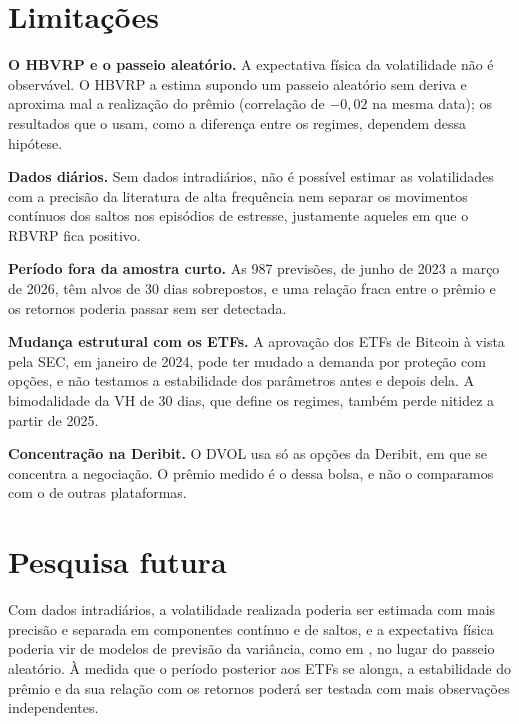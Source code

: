 \section{Limitações}
\label{sec:concl-limitacoes}

\textbf{O HBVRP e o passeio aleatório.} A expectativa física da volatilidade
não é observável. O HBVRP a estima supondo um passeio aleatório sem deriva e
aproxima mal a realização do prêmio (correlação de $-0{,}02$ na mesma data);
os resultados que o usam, como a diferença entre os regimes, dependem dessa
hipótese.

\textbf{Dados diários.} Sem dados intradiários, não é possível estimar as
volatilidades com a precisão da literatura de alta frequência
\citep{andersen2003realized} nem separar os movimentos contínuos dos saltos
nos episódios de estresse, justamente aqueles em que o RBVRP fica positivo.

\textbf{Período fora da amostra curto.} As 987 previsões, de junho de 2023 a
março de 2026, têm alvos de 30 dias sobrepostos, e uma relação fraca entre o
prêmio e os retornos poderia passar sem ser detectada.

\textbf{Mudança estrutural com os ETFs.} A aprovação dos ETFs de Bitcoin à
vista pela SEC, em janeiro de 2024, pode ter mudado a demanda por proteção
com opções, e não testamos a estabilidade dos parâmetros antes e depois dela.
A bimodalidade da VH de 30 dias, que define os regimes, também perde nitidez a
partir de 2025.

\textbf{Concentração na Deribit.} O DVOL usa só as opções da Deribit, em que
se concentra a negociação. O prêmio medido é o dessa
bolsa, e não o comparamos com o de outras plataformas.

\section{Pesquisa futura}
\label{sec:concl-pesquisa-futura}

Com dados intradiários, a
volatilidade realizada poderia ser estimada com mais precisão e separada em
componentes contínuo e de saltos, e a expectativa física poderia vir de
modelos de previsão da variância, como em \citet{bekaert2014vix}, no lugar do
passeio aleatório. À medida que o período posterior aos ETFs se alonga, a
estabilidade do prêmio e da sua relação com os retornos poderá ser testada
com mais observações independentes.
